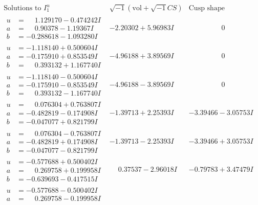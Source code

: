 \documentclass[1p]{elsarticle_modified}
\theoremstyle{definition}
\newcommand{\I}{\sqrt{-1}}
\begin{document}
$$\begin{array}{c|c|c}
\text{Solutions to }I^u_{1}& \I (\text{vol} + \sqrt{-1}CS) & \text{Cusp shape}\\
 \hline 
\begin{aligned}
u &= \phantom{-}1.129170 - 0.474242 I \\
a &= \phantom{-}0.90378 - 1.19367 I \\
b &= -0.288618 - 1.093280 I\end{aligned}
 & -2.20302 + 5.96983 I & \phantom{-0.000000 } 0 \\ \hline\begin{aligned}
u &= -1.118140 + 0.500604 I \\
a &= -0.175910 + 0.853549 I \\
b &= \phantom{-}0.393132 + 1.167740 I\end{aligned}
 & -4.96188 + 3.89569 I & \phantom{-0.000000 } 0 \\ \hline\begin{aligned}
u &= -1.118140 - 0.500604 I \\
a &= -0.175910 - 0.853549 I \\
b &= \phantom{-}0.393132 - 1.167740 I\end{aligned}
 & -4.96188 - 3.89569 I & \phantom{-0.000000 } 0 \\ \hline\begin{aligned}
u &= \phantom{-}0.076304 + 0.763807 I \\
a &= -0.482819 - 0.174908 I \\
b &= -0.047077 + 0.821799 I\end{aligned}
 & -1.39713 + 2.25393 I & -3.39466 - 3.05753 I \\ \hline\begin{aligned}
u &= \phantom{-}0.076304 - 0.763807 I \\
a &= -0.482819 + 0.174908 I \\
b &= -0.047077 - 0.821799 I\end{aligned}
 & -1.39713 - 2.25393 I & -3.39466 + 3.05753 I \\ \hline\begin{aligned}
u &= -0.577688 + 0.500402 I \\
a &= \phantom{-}0.269758 + 0.199958 I \\
b &= -0.639693 - 0.417515 I\end{aligned}
 & \phantom{-}0.37537 - 2.96018 I & -0.79783 + 3.47479 I \\ \hline\begin{aligned}
u &= -0.577688 - 0.500402 I \\
a &= \phantom{-}0.269758 - 0.199958 I \\

\end{aligned}
\end{array}$$
\end{document}
